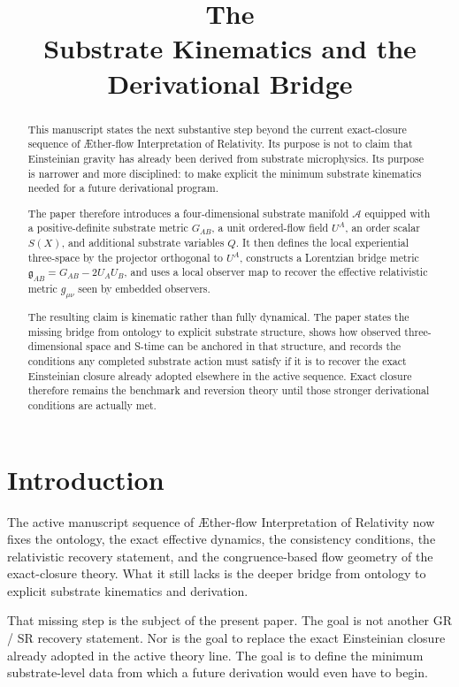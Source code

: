 \documentclass[11pt]{article}
\title{\textbf{The \TheoryName{}}\\[0.4em]
\large Substrate Kinematics and the Derivational Bridge}
\author{}
\date{}
\newcommand{\Aflow}{\AE{}ther-flow}
\newcommand{\TheoryName}{\Aflow{} Interpretation of Relativity}
\newcommand{\Sub}{\mathcal{A}}
\newcommand{\BridgeMetric}{\mathfrak{g}}
\begin{document}
\maketitle

\begin{abstract}
This manuscript states the next substantive step beyond the current exact-closure sequence of \TheoryName{}. Its purpose is not to claim that Einsteinian gravity has already been derived from substrate microphysics. Its purpose is narrower and more disciplined: to make explicit the minimum substrate kinematics needed for a future derivational program.

The paper therefore introduces a four-dimensional substrate manifold \(\Sub\) equipped with a positive-definite substrate metric \(G_{AB}\), a unit ordered-flow field \(U^A\), an order scalar \(S(X)\), and additional substrate variables \(Q\). It then defines the local experiential three-space by the projector orthogonal to \(U^A\), constructs a Lorentzian bridge metric \(\BridgeMetric_{AB} = G_{AB} - 2 U_A U_B\), and uses a local observer map to recover the effective relativistic metric \(g_{\mu\nu}\) seen by embedded observers.

The resulting claim is kinematic rather than fully dynamical. The paper states the missing bridge from ontology to explicit substrate structure, shows how observed three-dimensional space and S-time can be anchored in that structure, and records the conditions any completed substrate action must satisfy if it is to recover the exact Einsteinian closure already adopted elsewhere in the active sequence. Exact closure therefore remains the benchmark and reversion theory until those stronger derivational conditions are actually met.
\end{abstract}

\section{Introduction}

The active manuscript sequence of \TheoryName{} now fixes the ontology, the exact effective dynamics, the consistency conditions, the relativistic recovery statement, and the congruence-based flow geometry of the exact-closure theory. What it still lacks is the deeper bridge from ontology to explicit substrate kinematics and derivation.

That missing step is the subject of the present paper. The goal is not another GR / SR recovery statement. Nor is the goal to replace the exact Einsteinian closure already adopted in the active theory line. The goal is to define the minimum substrate-level data from which a future derivation would even have to begin.
\end{document}
